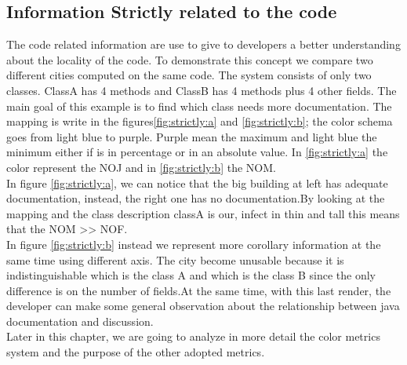 \documentclass[]{usiinfbachelorproject}
\begin{document}
\subsection{Information Strictly related to the code}
The code related information are use to give to developers a better understanding about the locality of the code. To demonstrate this concept we compare two different cities computed on the same code. The system  consists of only two classes. ClassA has 4 methods and ClassB has 4 methods plus 4 other fields. The main goal of this example is to find which class needs more documentation. 
The mapping is write in the figures\ref{fig:strictly:a} and \ref{fig:strictly:b}; the color schema goes from light blue to purple.
Purple mean the maximum and light blue the minimum either if is in percentage or in an absolute value.
In \ref{fig:strictly:a} the color represent the NOJ and in \ref{fig:strictly:b} the NOM.\\
In figure \ref{fig:strictly:a}, we can notice that the big building at left has adequate documentation, instead, the right one has no documentation.By looking at the mapping and the class description  classA is our, infect in thin and tall this means that  the NOM >> NOF.\\
In figure \ref{fig:strictly:b} instead we represent more corollary information at the same time using different axis. The city become unusable because it is indistinguishable which is the class A and which is the class B since the only difference is on the number of fields.At the same time, with this last render, the developer can make some general observation about the relationship between java documentation and discussion.\\
Later in this chapter, we are going to analyze in more detail the color metrics system and the purpose of the other adopted metrics.

 
 
 
 
\end{document}
